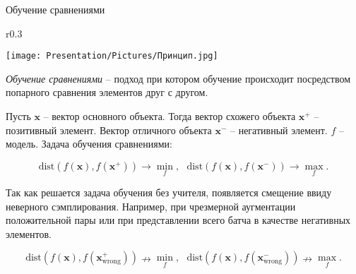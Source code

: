 \documentclass{beamer}
\begin{document}
\begin{frame}{Обучение сравнениями}
\small
\begin{wrapfigure}{r}{0.3\textwidth}
  \vspace{-20pt}
  \begin{center}
    \texttt{[image: Presentation/Pictures/Принцип.jpg]}
  \end{center}
  \vspace{-20pt}
\end{wrapfigure}

\textit{Обучение сравнениями} – подход при котором обучение происходит посредством попарного сравнения элементов друг с другом.

\bigskip

Пусть $\mathbf{x}$ -- вектор основного объекта. Тогда вектор схожего объекта $\mathbf{x}^+$ -- позитивный элемент. Вектор отличного объекта $\mathbf{x}^-$ -- негативный элемент. $f$ -- модель. Задача обучения сравнениями:

\[\text{dist}(f(\mathbf{x}), f(\mathbf{x}^+)) \to \underset{f}{\min}, ~~~ \text{dist}(f(\mathbf{x}), f(\mathbf{x}^-)) \to \underset{f}{\max}.\]

\bigskip

Так как решается задача обучения без учителя, появляется смещение ввиду неверного сэмплирования. Например, при чрезмерной аугментации положительной пары или при представлении всего батча в качестве негативных элементов.

\[\text{dist}(f(\mathbf{x}), f(\mathbf{x}^+_{\text{wrong}})) \nrightarrow \underset{f}{\min}, ~~~ \text{dist}(f(\mathbf{x}), f(\mathbf{x}^-_{\text{wrong}})) \nrightarrow \underset{f}{\max}.\]
\end{frame}
\end{document}
